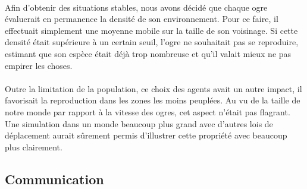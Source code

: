 \paragraph{}
Afin d'obtenir des situations stables, nous avons décidé que chaque ogre
évaluerait en permanence la densité de son environnement. Pour ce faire, il
effectuait simplement une moyenne mobile sur la taille de son voisinage. Si
cette densité était supérieure à un certain seuil, l'ogre ne souhaitait pas se
reproduire, estimant que son espèce était déjà trop nombreuse et qu'il valait
mieux ne pas empirer les choses.

\paragraph{}
Outre la limitation de la population, ce choix des agents avait un autre impact,
il favorisait la reproduction dans les zones les moins peuplées. Au vu de la
taille de notre monde par rapport à la vitesse des ogres, cet aspect n'était pas
flagrant. Une simulation dans un monde beaucoup plus grand avec d'autres lois de
déplacement aurait sûrement permis d'illustrer cette propriété avec beaucoup
plus clairement.

\subsection{Communication}
